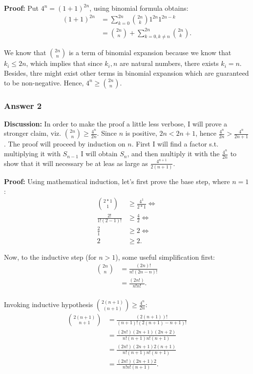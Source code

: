 \documentclass[11pt]{article}
\begin{document}
\textbf{Proof:} Put $4^n=(1+1)^{2n}$, using binomial formula obtains:
\begin{align*}
  (1+1)^{2n} &= \sum_{k=0}^{2n} {2n \choose k}1^{2n}1^{2n-k} \\
            &= {2n \choose n} + \sum_{k=0, k\neq n}^{2n} {2n \choose k}.
\end{align*}

We know that ${2n \choose n}$ is a term of binomial expansion because we
know that $k_i \leq 2n$, which implies that since $k_i, n$ are natural numbers,
there exists $k_i = n$.  Besides, thre might exist other terms in binomial
expansion which are guaranteed to be non-negative.  Hence,
$4^n \geq {2n \choose n}$.
\subsubsection{Answer 2}
\label{sec-1-1-2}
\textbf{Discussion:} In order to make the proof a little less verbose, I will prove
a stronger claim, viz. ${2n \choose n} \geq \frac{4^n}{2n}$.  Since $n$ is
positive, $2n < 2n +1$, hence $\frac{4^n}{2n} > \frac{4^n}{2n + 1}$.  The
proof will proceed by induction on $n$.  First I will find a factor s.t.
multiplying it with $S_{n-1}$ I will obtain $S_n$, and then multiply it
with the $\frac{4^n}{2n}$ to show that it will necessary be at leas as large
as $\frac{4^{n+1}}{2(n+1)}$.

\textbf{Proof:} Using mathematical induction, let's first prove the base step,
where $n=1$:
\begin{align*}
  { 2*1 \choose 1}    &\geq \frac{4^1}{2*1} \iff \\
  \frac{2!}{1!(2-1)!} &\geq \frac{4}{2} \iff \\
  \frac{2}{1}         &\geq 2 \iff \\
  2                   &\geq 2.
\end{align*}

Now, to the inductive step (for $n>1$), some useful simplification first:
\begin{equation}
  \begin{aligned}
    {2n \choose n} &= \frac{(2n)!}{n!(2n - n)!} \\
    &= \frac{(2n!)}{n!n!}. \\
  \end{aligned}
\end{equation}

Invoking inductive hypothesis ${2(n+1) \choose (n+1)} \geq \frac{4^n}{2n}$:
\begin{equation}
  \begin{aligned}
    {2(n+1) \choose n+1} &= \frac{(2(n+1))!}{(n+1)!(2(n+1) - n+1)!} \\
    &= \frac{(2n!)(2n+1)(2n+2)}{n!(n+1)n!(n+1)} \\
    &= \frac{(2n!)(2n+1)2(n+1)}{n!(n+1)n!(n+1)} \\
    &= \frac{(2n!)(2n+1)2}{n!n!(n+1)}.
  \end{aligned}
\end{equation}
\end{document}
